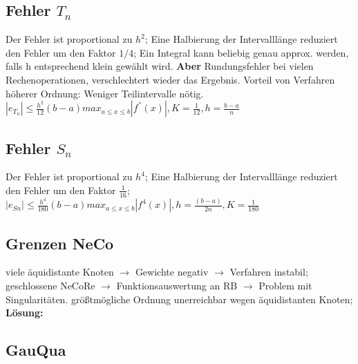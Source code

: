 \subsection{ Fehler $T_{n}$ }
Der Fehler ist proportional zu $ h^2 $; Eine Halbierung der Intervalllänge reduziert den Fehler um den Faktor $ 1 / 4 $; Ein Integral kann beliebig genau approx. werden, falls h entsprechend klein gewählt wird. \textbf{Aber} Rundungsfehler bei vielen Rechenoperationen, verschlechtert wieder das Ergebnis. Vorteil von Verfahren höherer Ordnung: Weniger Teilintervalle nötig.
$ |e_{T_n} | \le \frac{ h^2 }{12} (b-a) max_{a \le x \le b} | f^{''} (x) |, K =\frac{1}{12}, h = \frac{ b-a }{n} $

\subsection{Fehler $ S_{n} $}
Der Fehler ist proportional zu $ h^4 $; Eine Halbierung der Intervalllänge reduziert den Fehler um den Faktor $ \frac{1}{16} $;
$ | e_{Sn} | \le \frac{ h^{4} }{180} (b-a) max_{a \le x \le b} | f^{4} (x) |, h= \frac{(b-a)}{2n}, K = \frac{1}{180} $
\subsection{Grenzen NeCo}
viele äquidistante Knoten $\rightarrow$ Gewichte negativ $\rightarrow$ Verfahren instabil; 
geschlossene NeCoRe $\rightarrow$ Funktionsauswertung an RB $\rightarrow$ Problem mit Singularitäten.
größtmögliche Ordnung unerreichbar wegen äquidistanten Knoten; 
\textbf{Lösung:} 

\subsection{GauQua}